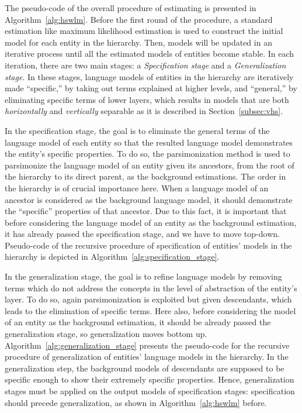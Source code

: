 The pseudo-code of the overall procedure of estimating \achswlm is presented in Algorithm~\ref{alg:hswlm}. 
Before the first round of the procedure, a standard estimation like maximum likelihood estimation is used to construct the initial model for each entity in the hierarchy. 
Then, models will be updated in an iterative process until all the estimated models of entities become stable. 
In each iteration, there are two main stages: a \emph{Specification stage} and a \emph{Generalization stage}. 
In these stages, language models of entities in the hierarchy are iteratively made ``specific,'' by taking out terms explained at higher levels, and ``general,'' by eliminating specific terms of lower layers, which results in models that are both \emph{horizontally} and \emph{vertically} separable as it is described in Section~\ref{subsec:vhs}.


In the specification stage, the goal is to eliminate the general terms of the language model of each entity so that the resulted language model demonstrates the entity's specific properties.  
To do so, the parsimonization method is used to parsimonize the language model of an entity given its ancestors, from the root of the hierarchy to its direct parent, as the background estimations. 
%
The order in the hierarchy is of crucial importance here. 
When a language model of an ancestor is considered as the background language model, it should demonstrate the ``specific'' properties of that ancestor. Due to this fact, it is important that before considering the language model of an entity as the background estimation, it has already passed the specification stage, and we have to move top-down.
Pseudo\:-\:code of the recursive procedure of specification of entities' models in the hierarchy is depicted in Algorithm~\ref{alg:specification_stage}.


In the generalization stage, the goal is to refine language models by removing terms which do not address the concepts in the level of abstraction of the entity's layer.
To do so, again parsimonization is exploited but given descendants, which leads to the elimination of specific terms. 
Here also, before considering the model of an entity as the background estimation, it should be already passed the generalization stage, so generalization moves bottom up.
Algorithm~\ref{alg:generalization_stage} presents the pseudo\:-\:code for the recursive procedure of generalization of entities' language models in the hierarchy. 
In the generalization step, the background models of descendants are supposed to be specific enough to show their extremely specific properties. Hence, generalization stages must be applied on the output models of specification stages: specification should precede generalization, as shown in Algorithm~\ref{alg:hswlm} before.
